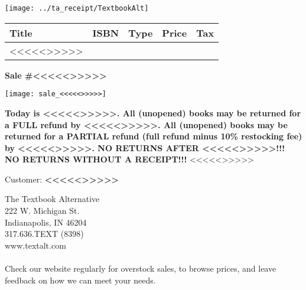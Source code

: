 \documentclass[english]{article}
\providecommand{\tabularnewline}{\\}
\begin{document}
\begin{center}
\texttt{[image: ../ta\_receipt/TextbookAlt]}
\par\end{center}

\vspace{0in}


\begin{center}
\begin{tabular}{|l|c|c|c|c|}
\hline 
\textbf{\large Title} & \textbf{\large ISBN} & \textbf{\large Type} & \textbf{\large Price} & \textbf{\large Tax}\tabularnewline
\hline
\hline
<<<<<>>>>>
\end{tabular}
\par\end{center}

\vspace{0in}


\begin{center}
\textbf{\large Sale \#<<<<<>>>>>}
\par\end{center}{\large \par}

\begin{center}
\texttt{[image: sale\_<<<<<>>>>>]}
\par\end{center}

\vspace{0in}


\textbf{
\hspace{-0.1in} Today is <<<<<>>>>>. \newline
All (unopened) books may be returned for a FULL refund by <<<<<>>>>>. \newline
All (unopened) books may be returned for a PARTIAL refund (full refund minus 10\% restocking fee) by <<<<<>>>>>. \newline
NO RETURNS AFTER <<<<<>>>>>!!! \newline
NO RETURNS WITHOUT A RECEIPT!!! \newline
}
<<<<<>>>>>

{\large Customer: \textbf{<<<<<>>>>>}}


\vspace{0.1in}
The Textbook Alternative \\
222 W. Michigan St. \\
Indianapolis, IN  46204 \\
317.636.TEXT (8398) \\
www.textalt.com \\
\\
Check our website regularly for overstock sales, to browse prices, and leave feedback on how we can meet your needs.
\end{document}
